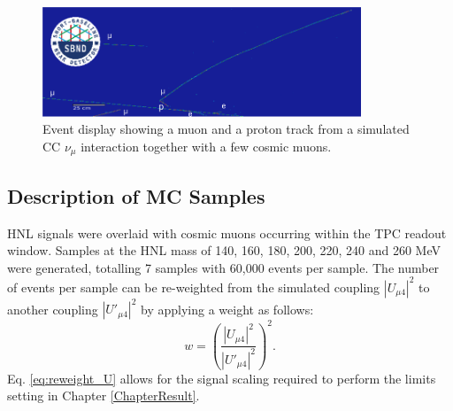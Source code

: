 \begin{figure}[hb!]
	\centering
        \includegraphics[width=0.85\textwidth]{1m1p_cos}
        \caption[Event Display of a Charged Currect Interaction Containing a Muon and a Proton]{
		Event display showing a muon and a proton track from a simulated CC $\nu_\mu$ interaction together with a few cosmic muons.
	}
	\label{fig:numu_cos_evd}
\end{figure}


\subsection{Description of MC Samples}
\label{sec:select_mc}


HNL signals were overlaid with cosmic muons occurring within the TPC readout window.
Samples at the HNL mass of 140, 160, 180, 200, 220, 240 and 260 MeV were generated, totalling 7 samples with 60,000 events per sample.
The number of events per sample can be re-weighted from the simulated coupling $|U_{\mu4}|^{2}$ to another coupling $|U'_{\mu4}|^{2}$ by applying a weight as follows:
\begin{equation}
    w = \left(\frac{|U_{\mu4}|^{2}}{|U'_{\mu4}|^{2}}\right)^{2}.
    \label{eq:reweight_U}
\end{equation}
Eq. \ref{eq:reweight_U} allows for the signal scaling required to perform the limits setting in Chapter \ref{ChapterResult}.   

